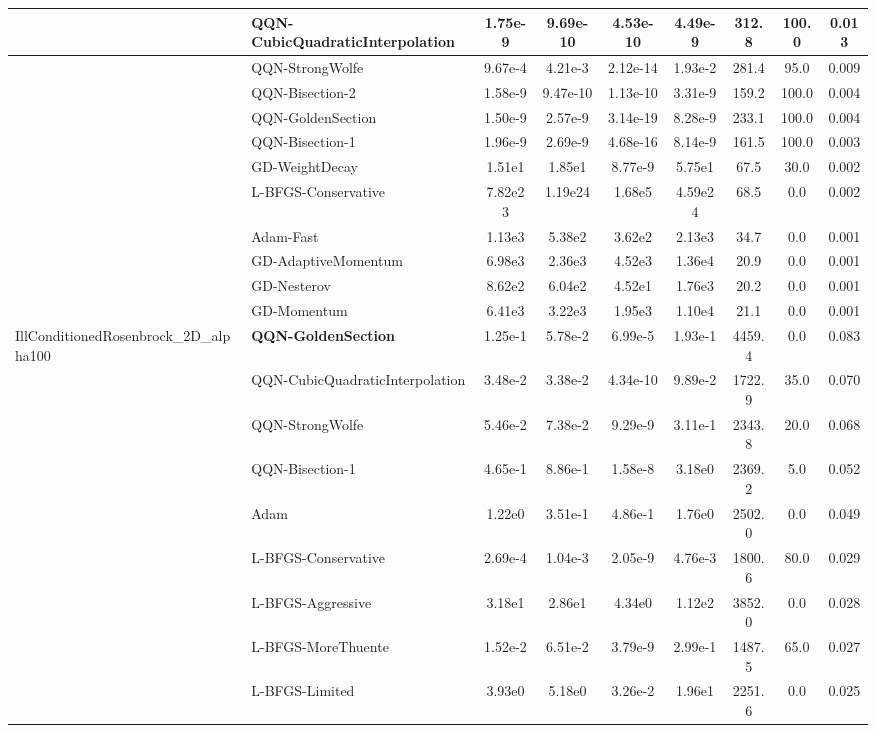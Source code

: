\documentclass[10pt]{article}
\begin{document}
\begin{longtable}{|l|l|c|c|c|c|c|c|c|}
\hline
 & QQN-CubicQuadraticInterpolation & 1.75e-9 & 9.69e-10 & 4.53e-10 & 4.49e-9 & 312.8 & 100.0 & 0.013 \\
\hline
 & QQN-StrongWolfe & 9.67e-4 & 4.21e-3 & 2.12e-14 & 1.93e-2 & 281.4 & 95.0 & 0.009 \\
\hline
 & QQN-Bisection-2 & 1.58e-9 & 9.47e-10 & 1.13e-10 & 3.31e-9 & 159.2 & 100.0 & 0.004 \\
\hline
 & QQN-GoldenSection & 1.50e-9 & 2.57e-9 & 3.14e-19 & 8.28e-9 & 233.1 & 100.0 & 0.004 \\
\hline
 & QQN-Bisection-1 & 1.96e-9 & 2.69e-9 & 4.68e-16 & 8.14e-9 & 161.5 & 100.0 & 0.003 \\
\hline
 & GD-WeightDecay & 1.51e1 & 1.85e1 & 8.77e-9 & 5.75e1 & 67.5 & 30.0 & 0.002 \\
\hline
 & L-BFGS-Conservative & 7.82e23 & 1.19e24 & 1.68e5 & 4.59e24 & 68.5 & 0.0 & 0.002 \\
\hline
 & Adam-Fast & 1.13e3 & 5.38e2 & 3.62e2 & 2.13e3 & 34.7 & 0.0 & 0.001 \\
\hline
 & GD-AdaptiveMomentum & 6.98e3 & 2.36e3 & 4.52e3 & 1.36e4 & 20.9 & 0.0 & 0.001 \\
\hline
 & GD-Nesterov & 8.62e2 & 6.04e2 & 4.52e1 & 1.76e3 & 20.2 & 0.0 & 0.001 \\
\hline
 & GD-Momentum & 6.41e3 & 3.22e3 & 1.95e3 & 1.10e4 & 21.1 & 0.0 & 0.001 \\
IllConditionedRosenbrock\_2D\_alpha100 & \textbf{QQN-GoldenSection} & 1.25e-1 & 5.78e-2 & 6.99e-5 & 1.93e-1 & 4459.4 & 0.0 & 0.083 \\
\hline
 & QQN-CubicQuadraticInterpolation & 3.48e-2 & 3.38e-2 & 4.34e-10 & 9.89e-2 & 1722.9 & 35.0 & 0.070 \\
\hline
 & QQN-StrongWolfe & 5.46e-2 & 7.38e-2 & 9.29e-9 & 3.11e-1 & 2343.8 & 20.0 & 0.068 \\
\hline
 & QQN-Bisection-1 & 4.65e-1 & 8.86e-1 & 1.58e-8 & 3.18e0 & 2369.2 & 5.0 & 0.052 \\
\hline
 & Adam & 1.22e0 & 3.51e-1 & 4.86e-1 & 1.76e0 & 2502.0 & 0.0 & 0.049 \\
\hline
 & L-BFGS-Conservative & 2.69e-4 & 1.04e-3 & 2.05e-9 & 4.76e-3 & 1800.6 & 80.0 & 0.029 \\
\hline
 & L-BFGS-Aggressive & 3.18e1 & 2.86e1 & 4.34e0 & 1.12e2 & 3852.0 & 0.0 & 0.028 \\
\hline
 & L-BFGS-MoreThuente & 1.52e-2 & 6.51e-2 & 3.79e-9 & 2.99e-1 & 1487.5 & 65.0 & 0.027 \\
\hline
 & L-BFGS-Limited & 3.93e0 & 5.18e0 & 3.26e-2 & 1.96e1 & 2251.6 & 0.0 & 0.025 \\

\end{longtable}
\end{document}
